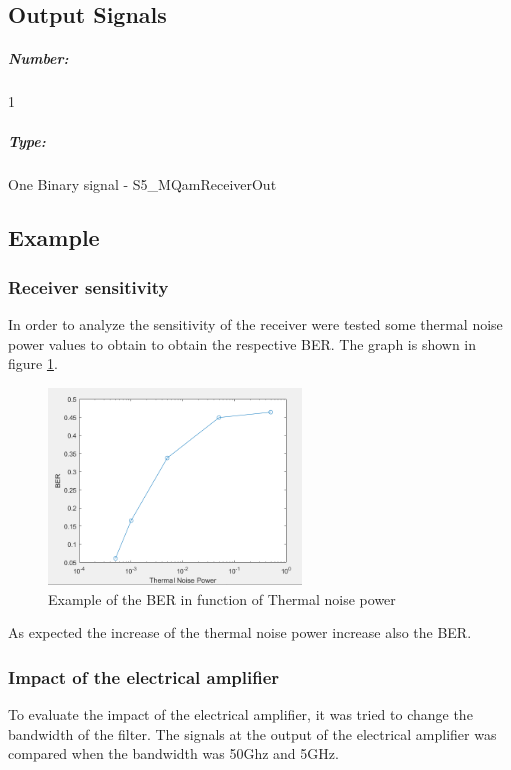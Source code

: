 \subsection*{Output Signals}

\subparagraph*{Number:} 1

\subparagraph*{Type:} One Binary signal - S5\_MQamReceiverOut

\newpage
\subsection*{Example}
\subsubsection*{Receiver sensitivity}

In order to analyze the sensitivity of the receiver were tested some thermal noise power values to obtain to obtain the respective BER. The graph is shown in figure \ref{Thermal_BER}.

\begin{figure}[H]
	\centering
	\includegraphics[width=0.6\textwidth]{./lib/m_qam_receiver/figure_PLoureiro/Thermal_BER.png}
	\caption{Example of the BER in function of Thermal noise power }\label{Thermal_BER}
\end{figure}

As expected the increase of the thermal noise power increase also the BER.

\subsubsection*{Impact of the electrical amplifier}
To evaluate the impact of the electrical amplifier, it was tried to change the bandwidth of the filter. The signals at the output of the electrical amplifier was compared when the bandwidth was 50Ghz and 5GHz.

